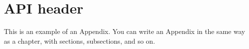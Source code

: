 
\chapter{API header}
This is an example of an Appendix. You can write an Appendix in the same way as a chapter, with sections, subsections, and so on.

